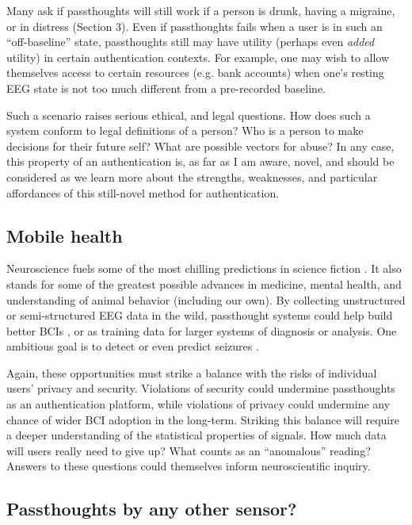 \documentclass[sigconf]{acmart}
\begin{document}
Many ask if passthoughts will still work if a person is drunk, having a migraine, or in distress (Section 3). 
Even if passthoughts fails when a user is in such an ``off-baseline'' state, 
passthoughts still may have utility (perhaps even \emph{added} utility) in certain authentication contexts.
For example, one may wish to allow themselves access to certain resources (e.g. bank accounts) when one's resting EEG state is not too much different from a pre-recorded baseline.

Such a scenario raises serious ethical, and legal questions. 
How does such a system conform to legal definitions of a person?
Who is a person to make decisions for their future self?
What are possible vectors for abuse?
In any case, this property of an authentication is, as far as I am aware, novel, and should be considered as we learn more about the strengths, weaknesses, and particular affordances of this still-novel method for authentication.
\subsection{Mobile health}
\label{sec:org2f78f9b}
Neuroscience fuels some of the most chilling predictions in science fiction \cite{Welsh2011}.
It also stands for some of the greatest possible advances in medicine, mental health, and understanding of animal behavior (including our own).
By collecting unstructured or semi-structured EEG data in the wild, 
passthought systems could help build better BCIs \cite{Grierson2011a},
or as training data for larger systems of diagnosis or analysis. 
One ambitious goal is to detect or even predict seizures \cite{Mormann2006}.

Again, these opportunities must strike a balance with the risks of individual users' privacy and security.
Violations of security could undermine passthoughts as an authentication platform,
while violations of privacy could undermine any chance of wider BCI adoption in the long-term.
Striking this balance will require a deeper understanding of the statistical properties of signals. 
How much data will users really need to give up? 
What counts as an ``anomalous'' reading?
Answers to these questions could themselves inform neuroscientific inquiry.

\subsection{Passthoughts by any other sensor?}
\label{sec:org5da47d1}
\end{document}
